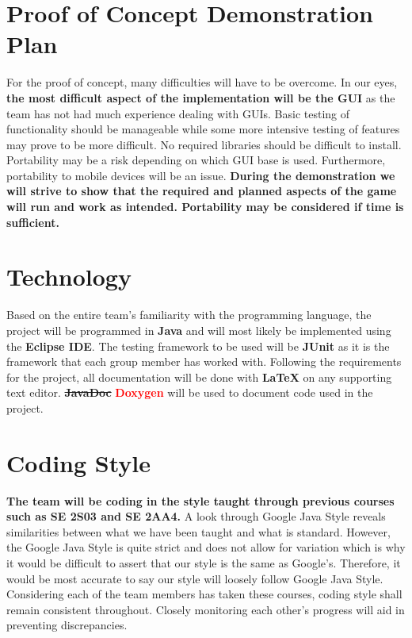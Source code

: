\documentclass[12pt, titlepage]{article}
\begin{document}
\section {Proof of Concept Demonstration Plan}

For the proof of concept, many difficulties will have to be overcome. In our eyes, \textbf{the most difficult aspect of the implementation will be the GUI} as the team has not had much experience dealing with GUIs. Basic testing of functionality should be manageable while some more intensive testing of features may prove to be more difficult. No required libraries should be difficult to install. Portability may be a risk depending on which GUI base is used. Furthermore, portability to mobile devices will be an issue. \textbf{During the demonstration we will strive to show that the required and planned aspects of the game will run and work as intended. Portability may be considered if time is sufficient.}


\section {Technology}
Based on the entire team's familiarity with the programming language, the project will be programmed in \textbf{Java} and will most likely be implemented using the \textbf{Eclipse IDE}. The testing framework to be used will be \textbf{JUnit} as it is the framework that each group member has worked with. Following the requirements for the project, all documentation will be done with \textbf{LaTeX} on any supporting text editor.  \sout{\textbf{JavaDoc}} \textbf{\textcolor{red}{Doxygen}} will be used to document code used in the project.

\section{Coding Style}
\textbf{The team will be coding in the style taught through previous courses such as SE 2S03 and SE 2AA4.} A look through Google Java Style reveals similarities between what we have been taught and what is standard. However, the Google Java Style is quite strict and does not allow for variation which is why it would be difficult to assert that our style is the same as Google's. Therefore, it would be most accurate to say our style will loosely follow Google Java Style. Considering each of the team members has taken these courses, coding style shall remain consistent throughout. Closely monitoring each other's progress will aid in preventing discrepancies.
\end{document}

